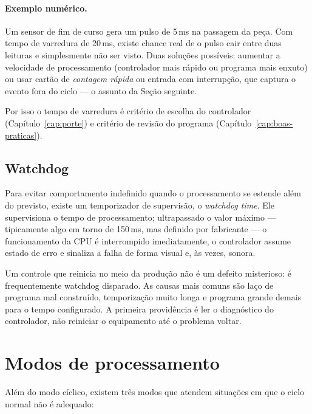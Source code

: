 \paragraph{Exemplo numérico.} Um sensor de fim de curso gera um pulso de 5\,ms na passagem da peça.
Com tempo de varredura de 20\,ms, existe chance real de o pulso cair entre duas leituras e
simplesmente não ser visto. Duas soluções possíveis: aumentar a velocidade de processamento
(controlador mais rápido ou programa mais enxuto) ou usar cartão de \emph{contagem rápida} ou entrada
com interrupção, que captura o evento fora do ciclo --- o assunto da Seção seguinte.

Por isso o tempo de varredura é critério de escolha do controlador (Capítulo~\ref{cap:porte}) e
critério de revisão do programa (Capítulo~\ref{cap:boas-praticas}).

\subsection{Watchdog}

Para evitar comportamento indefinido quando o processamento se estende além do previsto, existe um
temporizador de supervisão, o \emph{watchdog time}. Ele supervisiona o tempo de processamento;
ultrapassado o valor máximo --- tipicamente algo em torno de 150\,ms, mas definido por fabricante ---
o funcionamento da CPU é interrompido imediatamente, o controlador assume estado de erro e sinaliza a
falha de forma visual e, às vezes, sonora.

\begin{atencao}
Um controle que reinicia no meio da produção não é um defeito misterioso: é frequentemente watchdog
disparado. As causas mais comuns são laço de programa mal construído, temporização muito longa e
programa grande demais para o tempo configurado. A primeira providência é ler o diagnóstico do
controlador, não reiniciar o equipamento até o problema voltar.
\end{atencao}

\section{Modos de processamento}

Além do modo cíclico, existem três modos que atendem situações em que o ciclo normal não é adequado:

